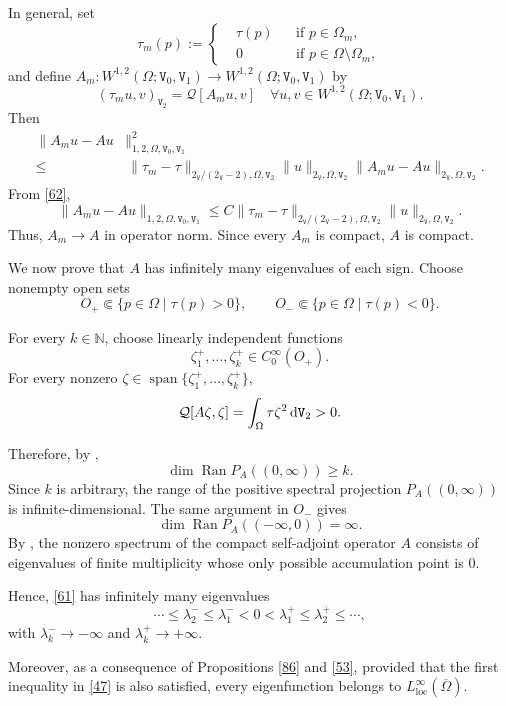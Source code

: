 \documentclass[reqno, 11pt, a4paper]{amsart}
\numberwithin{equation}{section}
\newcommand{\iwe}{ \tau}
\newcommand{\ops}{\mathcal{Q}}
\newcommand{\xv}{2_{\mathtt{V}}}
\newcommand{\womd}{W^{1,2} (\Omega ; \mathtt{V} _0 , \mathtt{V} _1)}
\newcommand{\wghtv}{\mathtt{V}}
\newcommand{\dwv}{\textnormal{d} \mathtt{V}}
\newcommand{\loc}{\operatorname{loc}}
\newcommand{\pvr}{p}
\begin{document}
In general, set
$$
\iwe_m(\pvr):=\left\{\begin{aligned}
&\iwe(\pvr) &&\text{if }\pvr\in\Omega_m,\\
&0 &&\text{if }\pvr\in\Omega\setminus\Omega_m,
\end{aligned}\right.
$$
and define $A_m:\womd\rightarrow\womd$ by
$$
(\iwe_m u,v)_{\wghtv_2}=\ops[A_mu,v]
\quad\forall u,v\in\womd.
$$
Then
$$
\begin{aligned}
\|A_mu-Au&\|_{1,2,\Omega,\wghtv_0,\wghtv_1}^2\\[3pt]
\leq&\,
\|\iwe_m-\iwe\|_{\xv/(\xv-2),\Omega,\wghtv_2}
\|u\|_{\xv,\Omega,\wghtv_2}
\|A_mu-Au\|_{\xv,\Omega,\wghtv_2}.
\end{aligned}
$$
From \eqref{62},
$$
\|A_mu-Au\|_{1,2,\Omega,\wghtv_0,\wghtv_1}
\leq
C\|\iwe_m-\iwe\|_{\xv/(\xv-2),\Omega,\wghtv_2}
\|u\|_{\xv,\Omega,\wghtv_2}.
$$
Thus, $A_m\rightarrow A$ in operator norm. Since every $A_m$ is compact, $A$ is compact.


We now prove that $A$ has infinitely many eigenvalues of each sign. Choose nonempty open sets
$$
O_+\Subset\{\pvr\in\Omega\mid\iwe(\pvr)>0\},
\qquad
O_-\Subset\{\pvr\in\Omega\mid\iwe(\pvr)<0\}.
$$


For every $k\in\mathbb N$, choose linearly independent functions
$$
\zeta _1^+,\ldots,\zeta _k^+\in C_0^\infty(O_+).
$$
For every nonzero $\zeta \in\operatorname{span}\{\zeta _1^+,\ldots,\zeta _k^+\}$,
$$
\ops[A\zeta ,\zeta ]
=
\int_\Omega\iwe\zeta ^2\,\dwv_2>0.
$$





Therefore, by \cite[Theorem 4.15, Section 4.5]{zbMATH06377290},
$$
\dim\operatorname{Ran}P_A((0,\infty))\geq k.
$$
Since $k$ is arbitrary, the range of the positive spectral
projection $P_A((0,\infty))$ is infinite-dimensional. The same argument in $O_-$ gives
$$
\dim\operatorname{Ran}P_A((-\infty,0))=\infty.
$$
By \cite[Theorem 6.6, Section 6.2]{zbMATH06377290}, the nonzero spectrum of the compact self-adjoint operator $A$ consists of eigenvalues of finite multiplicity whose only possible accumulation point is $0$.


Hence, \eqref{61} has infinitely many eigenvalues
$$
\cdots\leq\lambda_2^-\leq\lambda_1^-<0<\lambda_1^+\leq\lambda_2^+\leq\cdots,
$$
with $\lambda_k^-\rightarrow-\infty$ and $\lambda_k^+\rightarrow+\infty$.

Moreover, as a consequence of Propositions \ref{86} and \ref{53}, provided that the first inequality in \ref{47} is also satisfied, every eigenfunction belongs to \(L^\infty_{\loc}(\overline\Omega)\).
\end{document}
